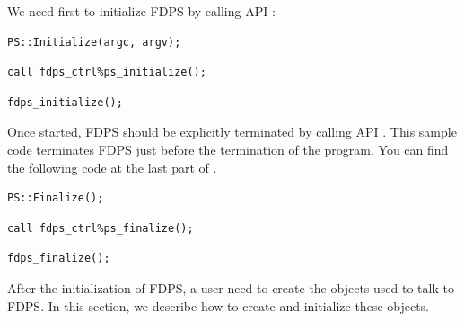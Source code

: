 We need first to initialize FDPS by calling API :

\ifCpp %
\begin{lstlisting}[caption=Initialize FDPS]
PS::Initialize(argc, argv);
\end{lstlisting}
\endifCpp
\ifFtn %
\begin{lstlisting}[caption=Initialize FDPS]
call fdps_ctrl%ps_initialize();
\end{lstlisting}
\endifFtn
\ifC %
\begin{lstlisting}[caption=Initialize FDPS]
fdps_initialize();
\end{lstlisting}
\endifC

Once started, FDPS should be explicitly terminated by calling API . This sample code terminates FDPS just before the termination of the program. You can find the following code at the last part of \fileNameOfMainFunc.

\ifCpp %
\begin{lstlisting}[caption=Finalize FDPS]
PS::Finalize();
\end{lstlisting}
\endifCpp
\ifFtn %
\begin{lstlisting}[caption=Finalize FDPS]
call fdps_ctrl%ps_finalize();
\end{lstlisting}
\endifFtn
\ifC %
\begin{lstlisting}[caption=Finalize FDPS]
fdps_finalize();
\end{lstlisting}
\endifC


After the initialization of FDPS, a user need to create the objects used to talk to FDPS. In this section, we describe how to create and initialize these objects.


